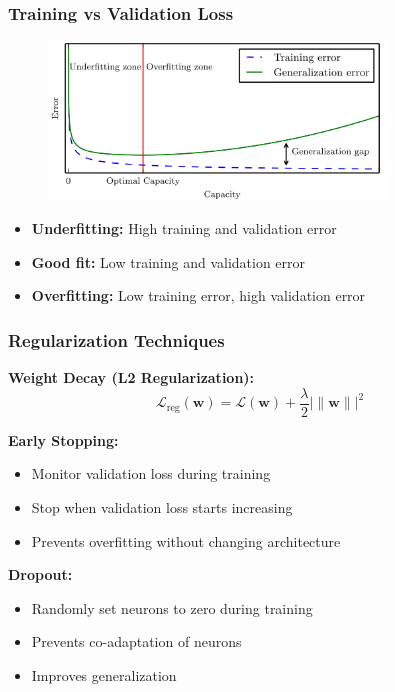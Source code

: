 \documentclass{beamer}
\begin{document}
\begin{frame}
\frametitle{Training vs Validation Loss}
\begin{figure}
\includegraphics[width=0.8\textwidth]{training-validation-fit.png}
\end{figure}

\begin{itemize}
    \item \textbf{Underfitting:} High training and validation error
    \item \textbf{Good fit:} Low training and validation error
    \item \textbf{Overfitting:} Low training error, high validation error
\end{itemize}
\end{frame}

\begin{frame}
\frametitle{Regularization Techniques}
\textbf{Weight Decay (L2 Regularization):}
\begin{equation}
\mathcal{L}_{\text{reg}}(\boldsymbol{w}) = \mathcal{L}(\boldsymbol{w}) + \frac{\lambda}{2} |\|\boldsymbol{w}\||^2
\end{equation}

\textbf{Early Stopping:}
\begin{itemize}
    \item Monitor validation loss during training
    \item Stop when validation loss starts increasing
    \item Prevents overfitting without changing architecture
\end{itemize}

\textbf{Dropout:}
\begin{itemize}
    \item Randomly set neurons to zero during training
    \item Prevents co-adaptation of neurons
    \item Improves generalization
\end{itemize}
\end{frame}
\end{document}
